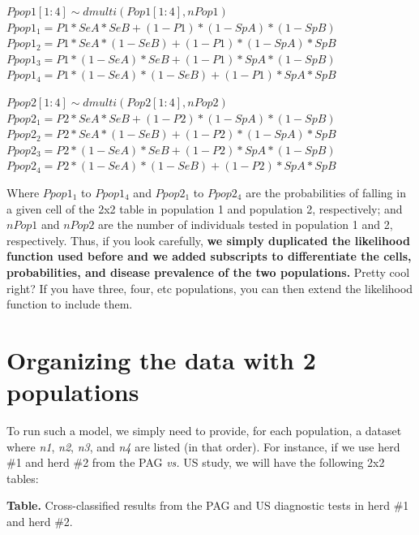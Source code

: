 \documentclass[
]{book}
\begin{document}
\(Ppop1[1:4] \sim dmulti(Pop1[1:4], nPop1)\)\\
\(Ppop1_1 = P1*SeA*SeB + (1-P1)*(1-SpA)*(1-SpB)\)\\
\(Ppop1_2 = P1*SeA*(1-SeB) + (1-P1)*(1-SpA)*SpB\)\\
\(Ppop1_3 = P1*(1-SeA)*SeB + (1-P1)*SpA*(1-SpB)\)\\
\(Ppop1_4 = P1*(1-SeA)*(1-SeB) + (1-P1)*SpA*SpB\)

\(Ppop2[1:4] \sim dmulti(Pop2[1:4], nPop2)\)\\
\(Ppop2_1 = P2*SeA*SeB + (1-P2)*(1-SpA)*(1-SpB)\)\\
\(Ppop2_2 = P2*SeA*(1-SeB) + (1-P2)*(1-SpA)*SpB\)\\
\(Ppop2_3 = P2*(1-SeA)*SeB + (1-P2)*SpA*(1-SpB)\)\\
\(Ppop2_4 = P2*(1-SeA)*(1-SeB) + (1-P2)*SpA*SpB\)

Where \(Ppop1_1\) to \(Ppop1_4\) and \(Ppop2_1\) to \(Ppop2_4\) are the probabilities of falling in a given cell of the 2x2 table in population 1 and population 2, respectively; and \(nPop1\) and \(nPop2\) are the number of individuals tested in population 1 and 2, respectively. Thus, if you look carefully, \textbf{we simply duplicated the likelihood function used before and we added subscripts to differentiate the cells, probabilities, and disease prevalence of the two populations.} Pretty cool right? If you have three, four, etc populations, you can then extend the likelihood function to include them.

\section{Organizing the data with 2 populations}\label{organizing-the-data-with-2-populations}

To run such a model, we simply need to provide, for each population, a dataset where \emph{n1}, \emph{n2}, \emph{n3}, and \emph{n4} are listed (in that order). For instance, if we use herd \#1 and herd \#2 from the PAG \emph{vs.} US study, we will have the following 2x2 tables:

\textbf{Table.} Cross-classified results from the PAG and US diagnostic tests in herd \#1 and herd \#2.
\end{document}
